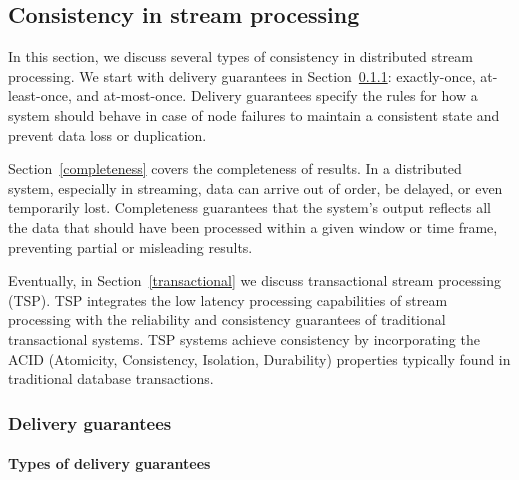 \subsection{Consistency in stream processing}
\label{consistency_overview}

In this section, we discuss several types of consistency in distributed stream processing. We start with delivery guarantees in Section~\ref{delivery_guarantees}: exactly-once, at-least-once, and at-most-once. Delivery guarantees specify the rules for how a system should behave in case of node failures to maintain a consistent state and prevent data loss or duplication.

Section~\ref{completeness} covers the completeness of results.  In a distributed system, especially in streaming, data can arrive out of order, be delayed, or even temporarily lost. Completeness guarantees that the system's output reflects all the data that should have been processed within a given window or time frame, preventing partial or misleading results.

Eventually, in Section~\ref{transactional} we discuss transactional stream processing (TSP). TSP integrates the low latency processing capabilities of stream processing with the reliability and consistency guarantees of traditional transactional systems. TSP systems achieve consistency by incorporating the ACID (Atomicity, Consistency, Isolation, Durability) properties typically found in traditional database transactions.


\subsubsection{Delivery guarantees}
\label{delivery_guarantees}

\paragraph{Types of delivery guarantees}\mbox{} \\

